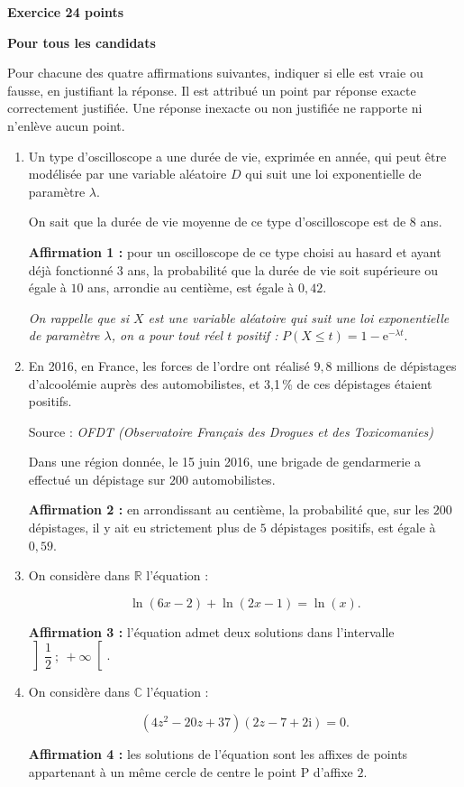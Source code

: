 \documentclass[10pt,a4paper]{article}
\newcommand{\R}{\mathbb{R}}
\newcommand{\C}{\mathbb{C}}
\begin{document}
\textbf{Exercice 2\hfill 4 points}
 
\textbf{Pour tous les candidats}

\medskip

Pour chacune des quatre affirmations suivantes, indiquer si elle est vraie ou fausse, en justifiant la
réponse. Il est attribué un point par réponse exacte correctement justifiée. Une réponse inexacte ou
non justifiée ne rapporte ni n'enlève aucun point.

\bigskip

\begin{enumerate}
\item Un type d'oscilloscope a une durée de vie, exprimée en année, qui peut être modélisée par une
variable aléatoire $D$ qui suit une loi exponentielle de paramètre $\lambda$.

On sait que la durée de vie moyenne de ce type d'oscilloscope est de $8$ ans.

\smallskip

\textbf{Affirmation 1 :} pour un oscilloscope de ce type choisi au hasard et ayant déjà fonctionné $3$ ans,
la probabilité que la durée de vie soit supérieure ou égale à $10$ ans, arrondie au centième, est
égale à $0,42$.

\emph{On rappelle que si $X$ est une variable aléatoire qui suit une loi exponentielle de paramètre $\lambda$, on a pour tout réel $t$ positif :} $P(X \leqslant t) = 1 - \text{e}^{-\lambda t}$.
\item  En 2016, en France, les forces de l'ordre ont réalisé $9,8$ millions de dépistages d'alcoolémie
auprès des automobilistes, et 3,1\,\% de ces dépistages étaient positifs.

Source : \emph{OFDT (Observatoire Français des Drogues et des Toxicomanies)}

Dans une région donnée, le 15 juin 2016, une brigade de gendarmerie a effectué un dépistage
sur $200$ automobilistes.

\smallskip

\textbf{Affirmation 2 :} en arrondissant au centième, la probabilité que, sur les $200$ dépistages, il y ait
eu strictement plus de $5$ dépistages positifs, est égale à $0,59$.
\item  On considère dans $\R$ l'équation :

\[\ln (6 x - 2) + \ln (2x - 1) = \ln (x).\]

\smallskip

\textbf{Affirmation 3 :} l'équation admet deux solutions dans l'intervalle $\left]\dfrac{1}{2}~;~+ \infty\right[$.
\item  On considère dans $\C$ l'équation : 

\[\left(4z^2 - 20z + 37\right)(2z -7 + 2\text{i}) = 0.\]


\smallskip

\textbf{Affirmation 4 :} les solutions de l'équation sont les affixes de points appartenant à un même
cercle de centre le point P d'affixe $2$.
\end{enumerate}
\end{document}
